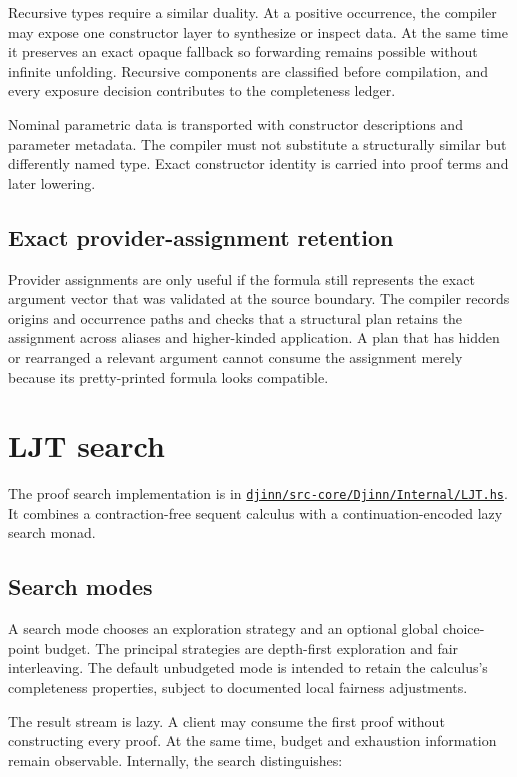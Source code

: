 \documentclass[10pt,letterpaper,oneside]{report}
\def\DjexBase{https://github.com/VladimirReshetnikov/Djex/blob/d3d9662598460316bdcd177ce6768c521e764aa8/}
\newcommand{\dpath}[1]{\href{\DjexBase#1}{\nolinkurl{#1}}}
\begin{document}
Recursive types require a similar duality. At a positive occurrence, the compiler may expose one constructor layer to synthesize or inspect data. At the same time it preserves an exact opaque fallback so forwarding remains possible without infinite unfolding. Recursive components are classified before compilation, and every exposure decision contributes to the completeness ledger.

Nominal parametric data is transported with constructor descriptions and parameter metadata. The compiler must not substitute a structurally similar but differently named type. Exact constructor identity is carried into proof terms and later lowering.

\subsection{Exact provider-assignment retention}

Provider assignments are only useful if the formula still represents the exact argument vector that was validated at the source boundary. The compiler records origins and occurrence paths and checks that a structural plan retains the assignment across aliases and higher-kinded application. A plan that has hidden or rearranged a relevant argument cannot consume the assignment merely because its pretty-printed formula looks compatible.

\section{LJT search}\label{sec:ljt-search}

The proof search implementation is in \dpath{djinn/src-core/Djinn/Internal/LJT.hs}. It combines a contraction-free sequent calculus with a continuation-encoded lazy search monad.

\subsection{Search modes}

A search mode chooses an exploration strategy and an optional global choice-point budget. The principal strategies are depth-first exploration and fair interleaving. The default unbudgeted mode is intended to retain the calculus's completeness properties, subject to documented local fairness adjustments.

The result stream is lazy. A client may consume the first proof without constructing every proof. At the same time, budget and exhaustion information remain observable. Internally, the search distinguishes:
\end{document}
